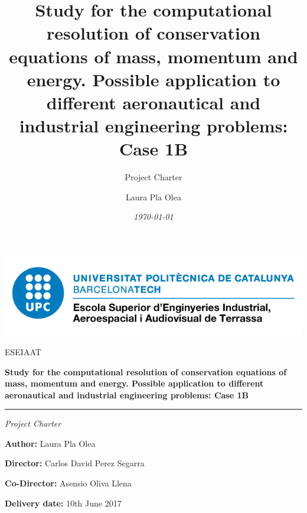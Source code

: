 \documentclass[12pt, titlepage]{scrartcl}
\title{Study for the computational resolution of conservation equations of mass, momentum and energy. Possible application to different aeronautical and industrial engineering problems: Case 1B}
\subtitle{Project Charter \vspace{7cm}}
\author{Laura Pla Olea}
\date{\textit{\today}}
\begin{document}
\begin{titlepage}
	\thispagestyle{titlepage}
	\begin{center}
	\includegraphics[scale=0.5]{image}\par\vspace{2cm}
	{\scshape\Large ESEIAAT \par}
	\vspace{1.5cm}
	{\huge\bfseries Study for the computational resolution of conservation equations of mass, momentum and energy. Possible application to different aeronautical and industrial engineering problems: Case 1B\par}
	\textcolor{blue}{\rule{\textwidth}{.6pt}}
	\vspace{2cm}
	{\Large\itshape Project Charter\par}
	\vfill
	\end{center}
	
	\vspace{10pt}
	\textbf{Author:} Laura Pla Olea
	
	\textbf{Director:} Carlos David Perez Segarra
	
	\textbf{Co-Director:} Asensio Oliva Llena
	
	\textbf{Delivery date:} 10th June 2017
	\vspace{10pt}

\end{titlepage}
\tableofcontents
\pagebreak
\pagebreak










\end{document}
